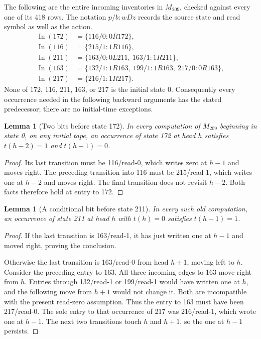 \documentclass[11pt,letterpaper]{article}
\newtheorem{lemma}[theorem]{Lemma}
\newcommand{\old}{M_{209}}
\begin{document}
The following are the entire incoming inventories in \(\old\), checked
against every one of its 418 rows. The notation \(p/b:wDz\) records
the source state and read symbol as well as the action.
\begin{align*}
\operatorname{In}(172)&=\{116/0:0R172\},\\
\operatorname{In}(116)&=\{215/1:1R116\},\\
\operatorname{In}(211)&=\{163/0:0L211,\ 163/1:1R211\},\\
\operatorname{In}(163)&=\{132/1:1R163,\ 199/1:1R163,\ 217/0:0R163\},\\
\operatorname{In}(217)&=\{216/1:1R217\}.
\end{align*}
None of 172, 116, 211, 163, or 217 is the initial state 0.
Consequently every occurrence needed in the following backward arguments
has the stated predecessor; there are no initial-time exceptions.

\begin{lemma}[Two bits before state 172]
\label{lem:172}
In every computation of \(\old\) beginning in state 0, on any initial
tape, an occurrence of state 172 at head \(h\) satisfies
\(t(h-2)=1\) and \(t(h-1)=0\).
\end{lemma}
\begin{proof}
Its last transition must be 116/read-0, which writes zero at \(h-1\)
and moves right. The preceding transition into 116 must be 215/read-1,
which writes one at \(h-2\) and moves right. The final transition does
not revisit \(h-2\). Both facts therefore hold at entry to 172.
\end{proof}

\begin{lemma}[A conditional bit before state 211]
\label{lem:211}
In every such old computation, an occurrence of state 211 at head \(h\)
with \(t(h)=0\) satisfies \(t(h-1)=1\).
\end{lemma}
\begin{proof}
If the last transition is 163/read-1, it has just written one at \(h-1\)
and moved right, proving the conclusion.

Otherwise the last transition is 163/read-0 from head \(h+1\), moving
left to \(h\). Consider the preceding entry to 163. All three incoming
edges to 163 move right from \(h\). Entries through 132/read-1 or
199/read-1 would have written one at \(h\), and the following move from
\(h+1\) would not change it. Both are incompatible with the present
read-zero assumption. Thus the entry to 163 must have been 217/read-0.
The sole entry to that occurrence of 217 was 216/read-1, which wrote one
at \(h-1\). The next two transitions touch \(h\) and \(h+1\), so
the one at \(h-1\) persists.
\end{proof}
\end{document}
